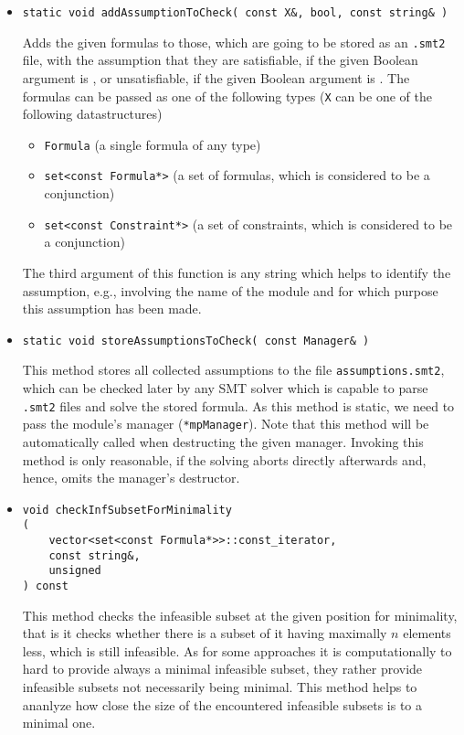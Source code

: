 \begin{itemize}
	\item \begin{verbatim}static void addAssumptionToCheck( const X&, bool, const string& ) \end{verbatim}
		Adds the given formulas to those, which are going to be stored as an \texttt{.smt2} file,
		with the assumption that they are satisfiable, if the given Boolean argument is \true, or unsatisfiable,
		if the given Boolean argument is \false. The formulas can be passed as one of the following types (\texttt{X} can be one of the following datastructures)
		\begin{itemize}
		\item \texttt{Formula} (a single formula of any type)
		\item \texttt{set<const Formula*>} (a set of formulas, which is considered to be a conjunction)
		\item \texttt{set<const Constraint*>} (a set of constraints, which is considered to be a conjunction)
		\end{itemize}
		The third argument of this function is any string which helps to identify the assumption, e.g.,
		involving the name of the module and for which purpose this assumption has been made.
	\item \begin{verbatim}static void storeAssumptionsToCheck( const Manager& )\end{verbatim}
		This method stores all collected assumptions to the file \texttt{assumptions.smt2}, which can be checked
		later by any SMT solver which is capable to parse \texttt{.smt2} files and solve
		the stored formula. As this method is static, we need to pass the module's manager (\texttt{*mpManager}).
		Note that this method will be automatically called when destructing the given manager. Invoking this
		method is only reasonable, if the solving aborts directly afterwards and, hence, omits the manager's
		destructor.
	\item \begin{verbatim}void checkInfSubsetForMinimality
(
    vector<set<const Formula*>>::const_iterator,
    const string&,
    unsigned
) const 
\end{verbatim}
This method checks the infeasible subset at the given position for minimality, that is it checks whether there is a subset of it having maximally $n$ elements less, which is still infeasible.
As for some approaches it is computationally to hard to provide always a minimal infeasible subset, they rather provide infeasible subsets not necessarily being minimal. This method helps 
to ananlyze how close the size of the encountered infeasible subsets is to a minimal one.
\end{itemize}

